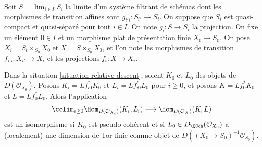 \begin{situation}
\label{situation-relative-descent}
Soit $S = \lim_{i \in I} S_i$ la limite d'un système filtrant de schémas
dont les morphismes de transition affines sont $g_{i'i} : S_{i'} \to S_i$.
On suppose que $S_i$ est quasi-compact et quasi-séparé pour tout $i \in I$.
On note $g_i : S \to S_i$ la projection. On fixe un élément $0 \in I$
et un morphisme plat de présentation finie $X_0 \to S_0$.
On pose $X_i = S_i \times_{S_0} X_0$ et $X = S \times_{S_0} X_0$,
et l'on note les morphismes de transition $f_{i'i} : X_{i'} \to X_i$
et les projections $f_i : X \to X_i$.
\end{situation}

\begin{lemma}
\label{lemma-relative-descend-homomorphisms}
Dans la situation \ref{situation-relative-descent},
soient $K_0$ et $L_0$ des objets de $D(\mathcal{O}_{X_0})$.
Posons $K_i = Lf_{i0}^*K_0$ et $L_i = Lf_{i0}^*L_0$ pour $i \geq 0$,
et posons $K = Lf_0^*K_0$ et $L = Lf_0^*L_0$. Alors l'application
$$
\colim_{i \geq 0} \Hom_{D(\mathcal{O}_{X_i})}(K_i, L_i)
\longrightarrow
\Hom_{D(\mathcal{O}_X)}(K, L)
$$
est un isomorphisme si $K_0$ est pseudo-cohérent et si
$L_0 \in D_\QCoh(\mathcal{O}_{X_0})$ a (localement)
une dimension de Tor finie comme objet de
$D((X_0 \to S_0)^{-1}\mathcal{O}_{S_0})$.
\end{lemma}

